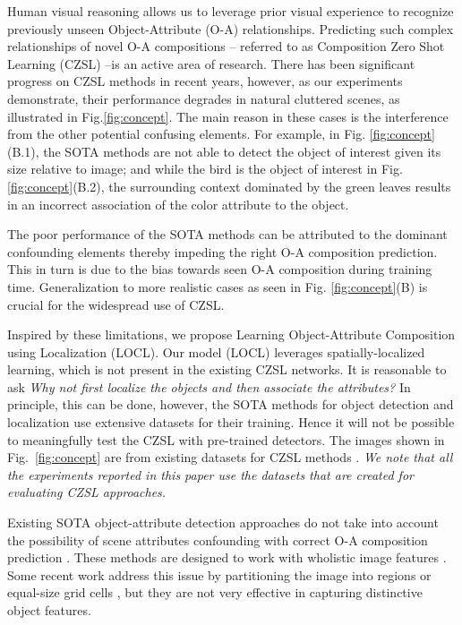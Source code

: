 \documentclass{bmvc2k}
\begin{document}
Human visual reasoning allows us to leverage prior visual experience to recognize previously unseen Object-Attribute (O-A) relationships. 
Predicting such complex relationships of novel O-A compositions -- referred to as Composition Zero Shot Learning (CZSL) \cite{mancini2021open,naeem2021learning,li2020symmetry, xu2021relation,ruis2021independent,misra2017red, Wei_2019_ICCV, purushwalkam2019task}--is an active area of research. There has been significant progress on CZSL methods in recent years, however, as our experiments demonstrate, their performance degrades in natural cluttered scenes, as illustrated in Fig.\ref{fig:concept}. 
The main reason in these cases is the interference from the other potential confusing elements. For example, in Fig. \ref{fig:concept}(B.1), the SOTA methods are not able to detect the object of interest given its size relative to image; and while the bird is the object of interest in Fig. \ref{fig:concept}(B.2), the surrounding context dominated by the green leaves results in an incorrect association of the color attribute to the object. 

The poor performance of the SOTA methods can be attributed to the dominant confounding elements thereby impeding the right O-A composition prediction. This in turn is due to the bias towards seen O-A composition during training time. Generalization to more realistic cases as seen in Fig. \ref{fig:concept}(B) is crucial for the widespread use of CZSL. 

Inspired by these limitations, we propose Learning Object-Attribute Composition using Localization (LOCL). Our model (LOCL) leverages spatially-localized learning, which is not present in the existing CZSL networks. It is reasonable to ask \textit{Why not first localize the objects and then associate the attributes?} In principle, this can be done, however, the SOTA methods for object detection and localization use extensive datasets for their training. Hence it will not be possible to meaningfully test the CZSL with pre-trained detectors. The images shown in Fig.~\ref{fig:concept} are from existing datasets for CZSL methods \cite{isola2015discovering, yu2017semantic, naeem2021learning}. \textit{We note that all the experiments reported in this paper use the datasets that are created for evaluating CZSL approaches.}

Existing SOTA object-attribute detection approaches do not take into account the possibility of scene attributes confounding with correct O-A composition prediction \cite{mancini2021open,naeem2021learning,li2020symmetry}. These methods are designed to work with wholistic image features \cite{xu2021relation,ruis2021independent,misra2017red, Wei_2019_ICCV, purushwalkam2019task}. Some recent work address this issue by partitioning the image into regions \cite{xu2015show, huynh2020compositional} or equal-size grid cells \cite{jaderberg2015spatial, zhao2019recognizing, huynh2020fine}, but they are not very effective in capturing distinctive object features.
\end{document}
